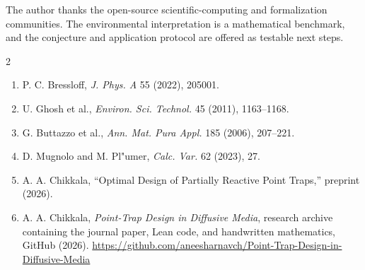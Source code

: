 \documentclass[10pt]{article}
\begin{document}
The author thanks the open-source scientific-computing and formalization communities. The environmental interpretation is a mathematical benchmark, and the conjecture and application protocol are offered as testable next steps.

\begin{multicols}{2}
\footnotesize
\begin{enumerate}
\setlength{\itemsep}{2pt}
\item P. C. Bressloff, \emph{J. Phys. A} 55 (2022), 205001.
\item U. Ghosh et al., \emph{Environ. Sci. Technol.} 45 (2011), 1163--1168.
\item G. Buttazzo et al., \emph{Ann. Mat. Pura Appl.} 185 (2006), 207--221.
\item D. Mugnolo and M. Pl{"u}mer, \emph{Calc. Var.} 62 (2023), 27.
\item A. A. Chikkala, ``Optimal Design of Partially Reactive Point Traps,'' preprint (2026).
\item A. A. Chikkala, \emph{Point-Trap Design in Diffusive Media}, research archive containing the journal paper, Lean code, and handwritten mathematics, GitHub (2026). \url{https://github.com/aneesharnavch/Point-Trap-Design-in-Diffusive-Media}
\end{enumerate}
\end{multicols}
\end{document}
